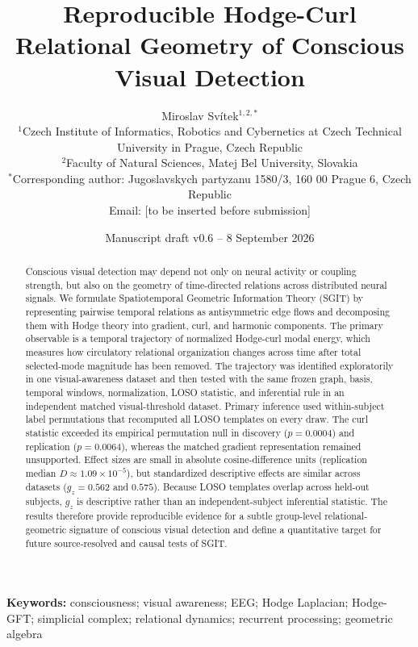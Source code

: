 \documentclass[12pt]{article}
\title{\textbf{Reproducible Hodge-Curl Relational Geometry of Conscious Visual Detection}}
\author{\parbox{0.94\textwidth}{\centering
Miroslav Sv\'itek$^{1,2,*}$\\[0.5em]
\small $^{1}$Czech Institute of Informatics, Robotics and Cybernetics at Czech Technical University in Prague, Czech Republic\\
\small $^{2}$Faculty of Natural Sciences, Matej Bel University, Slovakia\\
\small $^{*}$Corresponding author: Jugoslavskych partyzanu 1580/3, 160 00 Prague 6, Czech Republic\\
\small Email: [to be inserted before submission]}}
\date{Manuscript draft v0.6 -- 8 September 2026}
\begin{document}
\maketitle

\begin{abstract}
Conscious visual detection may depend not only on neural activity or coupling strength, but also on the geometry of time-directed relations across distributed neural signals. We formulate Spatiotemporal Geometric Information Theory (SGIT) by representing pairwise temporal relations as antisymmetric edge flows and decomposing them with Hodge theory into gradient, curl, and harmonic components. The primary observable is a temporal trajectory of normalized Hodge-curl modal energy, which measures how circulatory relational organization changes across time after total selected-mode magnitude has been removed. The trajectory was identified exploratorily in one visual-awareness dataset and then tested with the same frozen graph, basis, temporal windows, normalization, LOSO statistic, and inferential rule in an independent matched visual-threshold dataset. Primary inference used within-subject label permutations that recomputed all LOSO templates on every draw. The curl statistic exceeded its empirical permutation null in discovery ($p=0.0004$) and replication ($p=0.0064$), whereas the matched gradient representation remained unsupported. Effect sizes are small in absolute cosine-difference units (replication median $D\approx1.09\times10^{-5}$), but standardized descriptive effects are similar across datasets ($g_z=0.562$ and $0.575$). Because LOSO templates overlap across held-out subjects, $g_z$ is descriptive rather than an independent-subject inferential statistic. The results therefore provide reproducible evidence for a subtle group-level relational-geometric signature of conscious visual detection and define a quantitative target for future source-resolved and causal tests of SGIT.
\end{abstract}
\noindent\textbf{Keywords:} consciousness; visual awareness; EEG; Hodge Laplacian; Hodge-GFT; simplicial complex; relational dynamics; recurrent processing; geometric algebra
\end{document}
